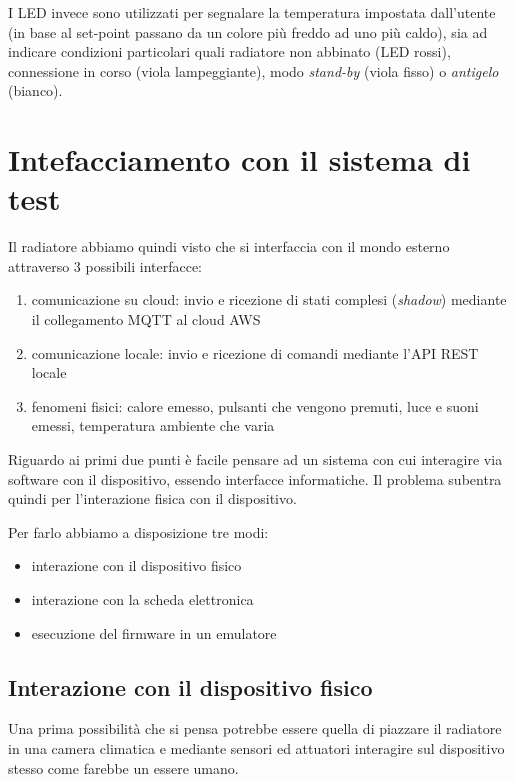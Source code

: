 \documentclass[12pt,a4paper,twoside,titlepage]{book}
\begin{document}
I LED invece sono utilizzati per segnalare la temperatura impostata dall'utente
(in base al set-point passano da un colore più freddo ad uno più caldo), sia ad
indicare condizioni particolari quali radiatore non abbinato (LED rossi), connessione
in corso (viola lampeggiante), modo \textit{stand-by} (viola fisso) o \textit{antigelo} (bianco).

\section{Intefacciamento con il sistema di test}

Il radiatore abbiamo quindi visto che si interfaccia con il mondo esterno attraverso
3 possibili interfacce:

\begin{enumerate}
    \item comunicazione su cloud: invio e ricezione di stati complesi (\textit{shadow})
        mediante il collegamento MQTT al cloud AWS
    \item comunicazione locale: invio e ricezione di comandi mediante l'API REST locale
    \item fenomeni fisici: calore emesso, pulsanti che vengono premuti, luce e suoni
        emessi, temperatura ambiente che varia
\end{enumerate}

Riguardo ai primi due punti è facile pensare ad un sistema con cui interagire via
software con il dispositivo, essendo interfacce informatiche. Il problema subentra quindi
per l'interazione fisica con il dispositivo.

Per farlo abbiamo a disposizione tre modi:
\begin{itemize}
    \item interazione con il dispositivo fisico
    \item interazione con la scheda elettronica
    \item esecuzione del firmware in un emulatore
\end{itemize}

\subsection{Interazione con il dispositivo fisico}

Una prima possibilità che si pensa potrebbe essere quella di piazzare il radiatore in una camera
climatica e mediante sensori ed attuatori interagire sul dispositivo stesso come farebbe
un essere umano.
\end{document}
